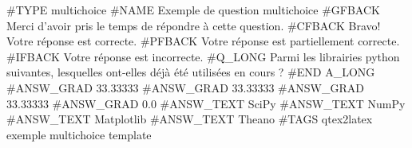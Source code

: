 #TYPE multichoice
#NAME Exemple de question multichoice
#GFBACK Merci d'avoir pris le temps de répondre à cette question.
#CFBACK Bravo! Votre réponse est correcte.
#PFBACK Votre réponse est partiellement correcte.
#IFBACK Votre réponse est incorrecte.
#Q_LONG
Parmi les librairies python suivantes, lesquelles ont-elles déjà été utilisées en cours ?
#END A_LONG
#ANSW_GRAD 33.33333 
#ANSW_GRAD 33.33333 
#ANSW_GRAD 33.33333 
#ANSW_GRAD 0.0 
#ANSW_TEXT SciPy
#ANSW_TEXT NumPy
#ANSW_TEXT Matplotlib
#ANSW_TEXT Theano
#TAGS qtex2latex exemple multichoice template 
